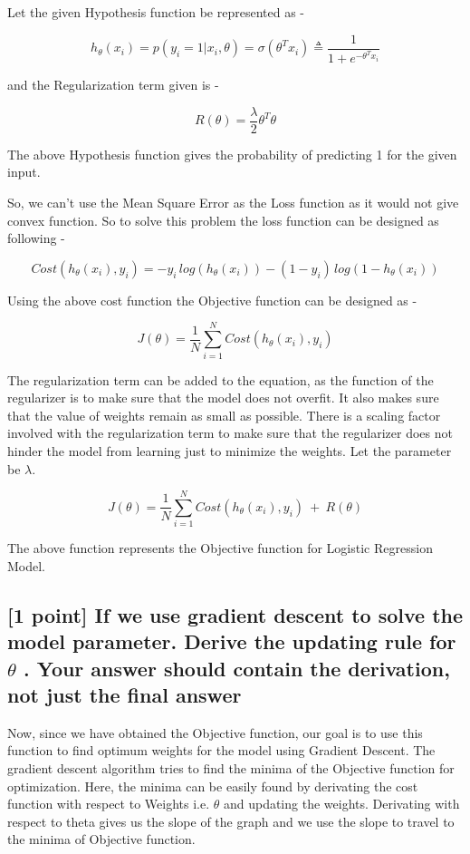 Let the given Hypothesis function be represented as - 

$$ h_\theta(x_i) = p(y_i = 1|x_i,\theta) =  \sigma(\theta^Tx_i) \triangleq \dfrac{1}{1 + e^{-\theta^Tx_{i}}} $$

and the Regularization term given is - 

$$ R(\theta) = \dfrac{\lambda}{2}\theta^T\theta$$

The above Hypothesis function gives the probability of predicting 1 for the given input. 

So, we can't use the Mean Square Error as the Loss function as it would not give convex function. So to solve this problem the loss function can be designed as following - 

$$ Cost(h_\theta(x_i), y_i) = -y_i\,log(h_\theta(x_i)) - (1-y_i)\,log(1-h_\theta(x_i))$$

Using the above cost function the Objective function can be designed as - 

$$J(\theta) = \frac{1}{N}\sum_{i=1}^{N}Cost(h_\theta(x_i), y_i) $$

The regularization term can be added to the equation, as the function of the regularizer is to make sure that the model does not overfit. It also makes sure that the value of weights remain as small as possible. There is a scaling factor involved with the regularization term to make sure that the regularizer does not hinder the model from learning just to minimize the weights. Let the parameter be $ \lambda $.

$$J(\theta) = \frac{1}{N}\sum_{i=1}^{N}Cost(h_\theta(x_i), y_i) \ + \  R(\theta)$$

The above function represents the Objective function for Logistic Regression Model. 

\subsection{[1 point] If we use gradient descent to solve the model parameter. Derive the updating
rule for $\theta$ . Your answer should contain the derivation, not just the final answer}

Now, since we have obtained the Objective function, our goal is to use this function to find optimum weights for the model using Gradient Descent. The gradient descent algorithm tries to find the minima of the Objective function for optimization. Here, the minima can be easily found by derivating the cost function with respect to Weights i.e. $\theta$ and updating the weights. Derivating with respect to theta gives us the slope of the graph and we use the slope to travel to the minima of Objective function. 

